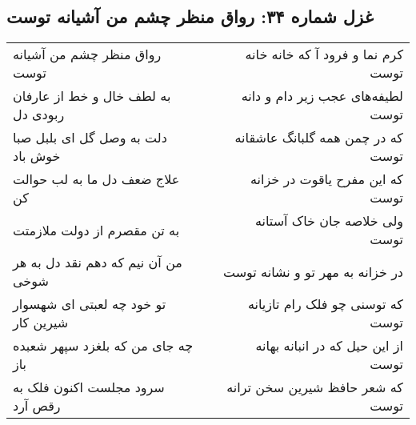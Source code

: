 \begin{center}
\section*{غزل شماره ۳۴: رواق منظر چشم من آشیانه توست}
\label{sec:sh034}
\begin{longtable}{l p{0.5cm} r}
رواق منظر چشم من آشیانه توست
&&
کرم نما و فرود آ که خانه خانه توست
\\
به لطف خال و خط از عارفان ربودی دل
&&
لطیفه‌های عجب زیر دام و دانه توست
\\
دلت به وصل گل ای بلبل صبا خوش باد
&&
که در چمن همه گلبانگ عاشقانه توست
\\
علاج ضعف دل ما به لب حوالت کن
&&
که این مفرح یاقوت در خزانه توست
\\
به تن مقصرم از دولت ملازمتت
&&
ولی خلاصه جان خاک آستانه توست
\\
من آن نیم که دهم نقد دل به هر شوخی
&&
در خزانه به مهر تو و نشانه توست
\\
تو خود چه لعبتی ای شهسوار شیرین کار
&&
که توسنی چو فلک رام تازیانه توست
\\
چه جای من که بلغزد سپهر شعبده باز
&&
از این حیل که در انبانه بهانه توست
\\
سرود مجلست اکنون فلک به رقص آرد
&&
که شعر حافظ شیرین سخن ترانه توست
\\
\end{longtable}
\end{center}

